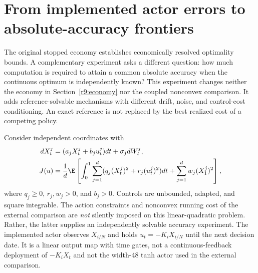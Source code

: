 \section{From implemented actor errors to absolute-accuracy frontiers}\label{r11:accuracy}
The original stopped economy establishes economically resolved optimality bounds. A complementary experiment asks a different question: how much computation is required to attain a common absolute accuracy when the continuous optimum is independently known? This experiment changes neither the economy in Section~\ref{r9:economy} nor the coupled nonconvex comparison. It adds reference-solvable mechanisms with different drift, noise, and control-cost conditioning. An exact reference is not replaced by the best realized cost of a competing policy.

Consider independent coordinates with
\begin{equation}\label{r11:lq}\begin{aligned}
 dX^j_t&=(a_jX^j_t+b_ju^j_t)dt+\sigma_jdW^j_t,\\
 J(u)&=\frac1d\E\left[\int_0^1\sum_{j=1}^d(q_j(X^j_t)^2+r_j(u^j_t)^2)dt+\sum_{j=1}^dw_j(X^j_1)^2\right],
\end{aligned}\end{equation}
where $q_j\geq0$, $r_j,w_j>0$, and $b_j>0$. Controls are unbounded, adapted, and square integrable. The action constraints and nonconvex running cost of the external comparison are \emph{not} silently imposed on this linear-quadratic problem. Rather, the latter supplies an independently solvable accuracy experiment. The implemented actor observes $X_{i/N}$ and holds $u_t=-K_iX_{i/N}$ until the next decision date. It is a linear output map with time gates, not a continuous-feedback deployment of $-K_iX_t$ and not the width-48 tanh actor used in the external comparison.

